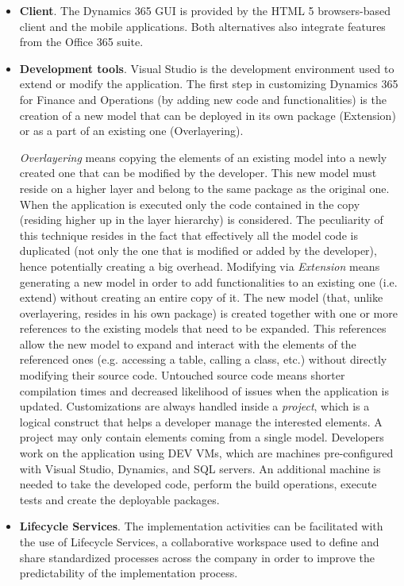 \begin{itemize}
    \item \textbf{Client}. The Dynamics 365 GUI is provided by the HTML 5 browsers-based client and the mobile applications. Both alternatives also integrate features from the Office 365 suite.
    
    \item \textbf{Development tools}. Visual Studio is the development environment used to extend or modify the application. The first step in customizing Dynamics 365 for Finance and Operations (by adding new code and functionalities) is the creation of a new model that can be deployed in its own package (Extension) or as a part of an existing one (Overlayering).
    
    \textit{Overlayering} means copying the elements of an existing model into a newly created one that can be modified by the developer. This new model must reside on a higher layer and belong to the same package as the original one. When the application is executed only the code contained in the copy (residing higher up in the layer hierarchy) is considered. The peculiarity of this technique resides in the fact that effectively all the model code is duplicated (not only the one that is modified or added by the developer), hence potentially creating a big overhead. Modifying via \textit{Extension} means generating a new model in order to add functionalities to an existing one (i.e. extend) without creating an entire copy of it. The new model (that, unlike overlayering, resides in his own package) is created together with one or more references to the existing models that need to be expanded. This references allow the new model to expand and interact with the elements of the referenced ones (e.g. accessing a table, calling a class, etc.) without directly modifying their source code. Untouched source code means shorter compilation times and decreased likelihood of issues when the application is updated. Customizations are always handled inside a \textit{project}, which is a logical construct that helps a developer manage the interested elements. A project may only contain elements coming from a single model. Developers work on the application using DEV VMs, which are machines pre-configured with Visual Studio, Dynamics, and SQL servers. An additional machine is needed to take the developed code, perform the build operations, execute tests and create the deployable packages.
    
    \item \textbf{Lifecycle Services}. The implementation activities can be facilitated with the use of Lifecycle Services, a collaborative workspace used to define and share standardized processes across the company in order to improve the predictability of the implementation process.
\end{itemize}


